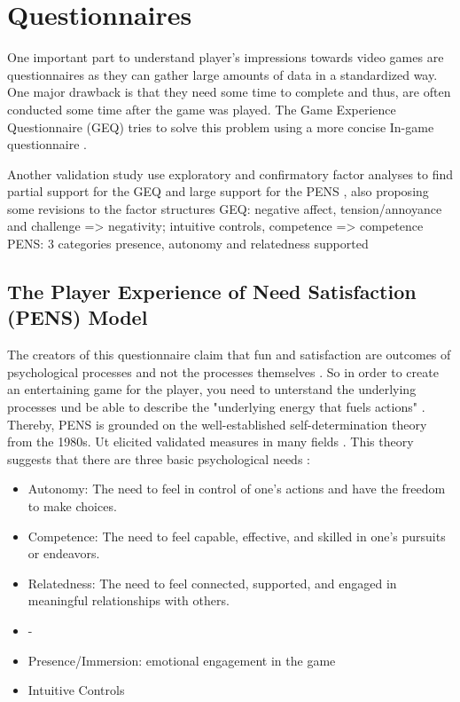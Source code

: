 \section{Questionnaires}
One important part to understand player's impressions towards video games are questionnaires as they can gather large amounts of data in a standardized way. One major drawback is that they need some time to complete and thus, are often conducted some time after the game was played. The Game Experience Questionnaire (GEQ) tries to solve this problem using a more concise In-game questionnaire \cite{poels2007game}. 

Another validation study use exploratory and confirmatory factor analyses to find partial support for the GEQ and large support for the PENS \cite{johnson2018validation}, also proposing some revisions to the factor structures
GEQ: negative affect, tension/annoyance and challenge => negativity;
	intuitive controls, competence => competence
PENS: 3 categories presence, autonomy and relatedness supported



\subsection{The Player Experience of Need Satisfaction (PENS) Model}
The creators of this questionnaire claim that fun and satisfaction are outcomes of psychological processes and not the processes themselves \cite{rigby2007player}. So in order to create an entertaining game for the player, you need to unterstand the underlying processes und be able to describe the "underlying energy that fuels actions" \cite{rigby2007player}. Thereby, PENS is grounded on the well-established self-determination theory from the 1980s. Ut elicited validated measures in many fields \cite{pietrabissa2020development,lohmann2017measuring,richards2021further}. This theory suggests that there are three basic psychological needs \cite{deci1985intrinsic}:
\begin{itemize}
	\item Autonomy: The need to feel in control of one's actions and have the freedom to make choices.
	\item Competence: The need to feel capable, effective, and skilled in one's pursuits or endeavors.
	\item Relatedness: The need to feel connected, supported, and engaged in meaningful relationships with others.
	\item -
	\item Presence/Immersion: emotional engagement in the game
	\item Intuitive Controls
\end{itemize}


